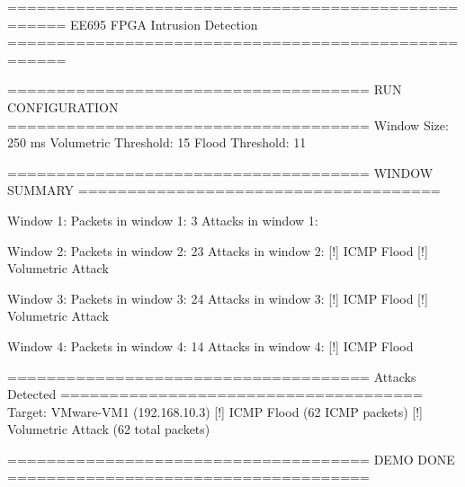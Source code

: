 

====================================================
        EE695 FPGA Intrusion Detection 
====================================================


=====================================
RUN CONFIGURATION
=====================================
Window Size: 250 ms
Volumetric Threshold: 15
Flood Threshold: 11


=====================================
WINDOW SUMMARY
=====================================

Window 1:
Packets in window 1: 3
Attacks in window 1:

Window 2:
Packets in window 2: 23
Attacks in window 2:
  [!] ICMP Flood
  [!] Volumetric Attack

Window 3:
Packets in window 3: 24
Attacks in window 3:
  [!] ICMP Flood
  [!] Volumetric Attack

Window 4:
Packets in window 4: 14
Attacks in window 4:
  [!] ICMP Flood


=====================================
Attacks Detected
=====================================
Target: VMware-VM1 (192.168.10.3)
  [!] ICMP Flood (62 ICMP packets)
  [!] Volumetric Attack (62 total packets)

=====================================
             DEMO DONE
=====================================

